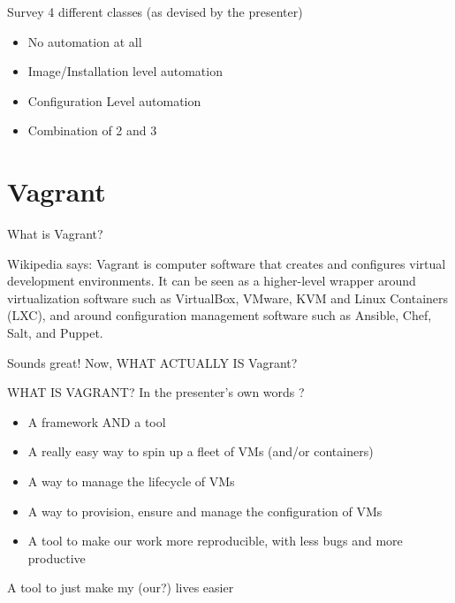 \documentclass{beamer}
\begin{document}
    \begin{frame}{Survey}
	4 different classes (as devised by the presenter)
        \begin{itemize}
	    \item No automation at all
	    \item Image/Installation level automation
	    \item Configuration Level automation
	    \item Combination of 2 and 3
        \end{itemize}
    \end{frame}

\section{Vagrant}
    \begin{frame}{What is Vagrant?}

    \begin{block}{Wikipedia says:}
		Vagrant is computer software that creates and configures virtual development environments.
		It can be seen as a higher-level wrapper around virtualization software such as VirtualBox,
		VMware, KVM and Linux Containers (LXC), and around configuration management software such as Ansible, Chef, Salt, and Puppet.
    \end{block}

    \pause Sounds great! Now, WHAT ACTUALLY IS Vagrant?
    \end{frame}

    \begin{frame}{WHAT IS VAGRANT?}
	    In the presenter's own words ?
        \begin{itemize}
	    \pause \item A framework AND a tool
	    \pause \item A really easy way to spin up a fleet of VMs (and/or containers)
	    \pause \item A way to manage the lifecycle of VMs
	    \pause \item A way to provision, ensure and manage the configuration of VMs
	    \pause \item A tool to make our work more reproducible, with less bugs and more productive
        \end{itemize}
	A tool to just make my (our?) lives easier
    \end{frame}
\end{document}
